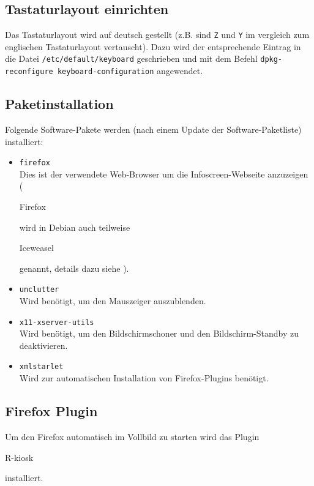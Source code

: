 \subsection{Tastaturlayout einrichten}
\label{sec:tastatur}
Das Tastaturlayout wird auf deutsch gestellt (z.B. sind \lstinline|Z| und \lstinline|Y| im vergleich zum englischen Tastaturlayout vertauscht).
Dazu wird der entsprechende Eintrag in die Datei \lstinline|/etc/default/keyboard| geschrieben und mit dem Befehl \lstinline|dpkg-reconfigure keyboard-configuration| angewendet.

\subsection{Paketinstallation}
Folgende Software-Pakete werden (nach einem Update der Software-Paketliste) installiert:
\begin{itemize}
	\item {\lstinline|firefox|\\Dies ist der verwendete Web-Browser um die Infoscreen-Webseite anzuzeigen (\begin{em}Firefox\end{em} wird in Debian auch teilweise \begin{em}Iceweasel\end{em} genannt, details dazu siehe \cite{iceweasel}).}
	\item {\lstinline|unclutter|\\Wird benötigt, um den Mauszeiger auszublenden.}
	\item {\lstinline|x11-xserver-utils|\\Wird benötigt, um den Bildschirmschoner und den Bildschirm-Standby zu deaktivieren.}
	\item {\lstinline|xmlstarlet|\\Wird zur automatischen Installation von Firefox-Plugins benötigt.}
\end{itemize}

\subsection{Firefox Plugin}
Um den Firefox automatisch im Vollbild zu starten wird das Plugin \begin{em}R-kiosk\end{em} \cite{rkiosk} installiert.

